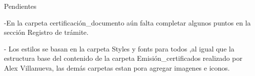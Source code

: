 Pendientes

-En la carpeta certificación_documento aún falta completar algunos 
 puntos en la sección Registro de trámite.

-  Los estilos se basan en la carpeta Styles y fonts para todos  ,al igual que la 
  estructura base del contenido de la carpeta Emisión_certificados realizado por Alex Villanueva,
  las demás carpetas estan pora agregar imagenes e iconos.

 
